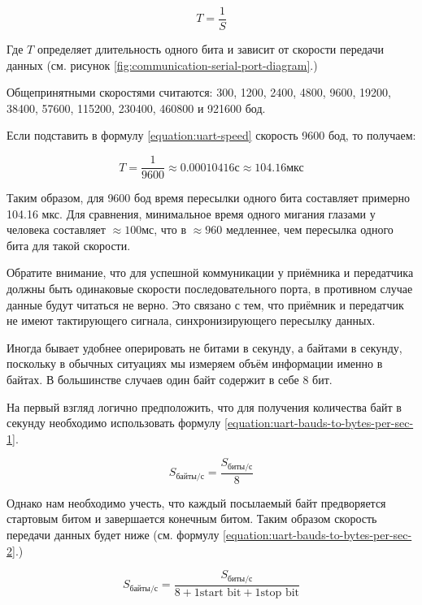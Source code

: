 \documentclass[../sparc.tex]{subfiles}
\begin{document}
\begin{equation}
  T = \frac{1}{S}
  \label{equation:uart-speed}
\end{equation}

Где $T$ определяет длительность одного бита и зависит от скорости передачи
данных (см. рисунок \ref{fig:communication-serial-port-diagram}.)

Общепринятными скоростями считаются: 300, 1200, 2400, 4800, 9600, 19200, 38400,
57600, 115200, 230400, 460800 и 921600 бод.

Если подставить в формулу \ref{equation:uart-speed} скорость 9600 бод, то получаем:

\begin{equation}
  T = \frac{1}{9600} \approx 0.00010416 \mbox{с} \approx 104.16 \mbox{мкс}
\end{equation}

Таким образом, для 9600 бод время пересылки одного бита составляет примерно
104.16 мкс.  Для сравнения, минимальное время одного мигания глазами у человека
составляет $\approx100 \mbox{мс}$\cite{chudler}, что в $\approx960$ медленнее,
чем пересылка одного бита для такой скорости.

Обратите внимание, что для успешной коммуникации у приёмника и передатчика
должны быть одинаковые скорости последовательного порта, в противном случае
данные будут читаться не верно.  Это связано с тем, что приёмник и передатчик не
имеют тактирующего сигнала, синхронизирующего пересылку данных.

Иногда бывает удобнее оперировать не битами в секунду, а байтами в секунду,
поскольку в обычных ситуациях мы измеряем объём информации именно в байтах. В
большинстве случаев один байт содержит в себе 8 бит.

На первый взгляд логично предположить, что для получения количества байт в
секунду необходимо использовать формулу
\ref{equation:uart-bauds-to-bytes-per-sec-1}.

\begin{equation}
  S_{\mbox{байты/с}} = \frac{S_{\mbox{биты/с}}}{8}
  \label{equation:uart-bauds-to-bytes-per-sec-1}
\end{equation}

Однако нам необходимо учесть, что каждый посылаемый байт предворяется стартовым
битом и завершается конечным битом.  Таким образом скорость передачи данных
будет ниже (см. формулу \ref{equation:uart-bauds-to-bytes-per-sec-2}.)

\begin{equation}
  S_{\mbox{байты/с}} = \frac{S_{\mbox{биты/с}}}{8 + 1 \mbox{start bit} + 1 \mbox{stop bit}}
  \label{equation:uart-bauds-to-bytes-per-sec-2}
\end{equation}
\end{document}
